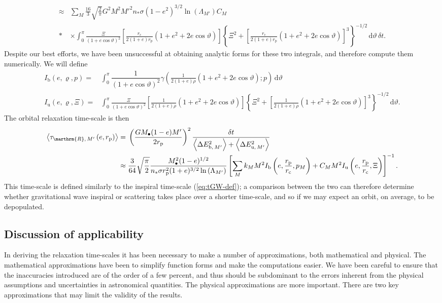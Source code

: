 \documentclass[useAMS,usedcolumn,usegraphicx,usenatbib]{mn2e}
\newcommand{\eqnref}[1]{(\ref{eq:#1})}
\newcommand{\sub}[1]{\ensuremath{_\mathrm{#1}}}
\newcommand{\dd}{\ensuremath{\mathrm{d}}}
\newcommand{\intd}[4]{\ensuremath{\displaystyle \int_{#1}^{#2}{#3}\,\dd{#4}}}
\newcommand{\recip}[1]{\ensuremath{\dfrac{1}{#1}}}
\begin{document}
\begin{onecolumn}
\begin{align}
 \approx {} & \sum_M \frac{16}{3}\sqrt{\frac{2}{\pi}}G^2 M^2{M'}^2n_\ast\sigma\left(1-e^2\right)^{3/2}\ln\left(\Lambda_{M'}\right)C_M \nonumber \\*
 & \times {} \intd{0}{\pi}{\frac{\Xi}{(1 + e \cos\vartheta)^2}\left[\frac{r\sub{c}}{2(1+e)r\sub{p}}\left(1+e^2+2e\cos\vartheta\right)\right]\left\{\Xi^2 + \left[\frac{r\sub{c}}{2(1+e)r\sub{p}}\left(1+e^2+2e\cos\vartheta\right)\right]^3\right\}^{-1/2}}{\vartheta}\,\delta t.
\end{align}
Despite our best efforts, we have been unsuccessful at obtaining analytic forms for these two integrals, and therefore compute them numerically. We will define
\begin{align}
I\sub{b}(e,\varrho,p) = {} & \intd{0}{\pi}{\recip{(1 + e \cos\vartheta)^2}\gamma\left(\frac{1}{2(1+e)\rho}\left(1+e^2+2e\cos\vartheta\right);p\right)}{\vartheta} \\
I\sub{u}(e,\varrho,\Xi) = {} & \intd{0}{\pi}{\frac{\Xi}{(1 + e \cos\vartheta)^2}\left[\frac{1}{2(1+e)\rho}\left(1+e^2+2e\cos\vartheta\right)\right]\left\{\Xi^2 + \left[\frac{1}{2(1+e)\rho}\left(1+e^2+2e\cos\vartheta\right)\right]^3\right\}^{-1/2}}{\vartheta}.
\end{align}
The orbital relaxation time-scale is then
\begin{align}
\left\langle\tau_{\marthrm{R},\,M'}\left(e,r\sub{p}\right)\right\rangle = {} & \left(\frac{GM_\bullet(1 - e)M'}{2r\sub{p}}\right)^2\frac{\delta t}{\left\langle\Delta E^2_{\mathrm{b},\,M'}\right\rangle + \left\langle\Delta E^2_{\mathrm{u},\,M'}\right\rangle} \\
 \approx {} & \frac{3}{64}\sqrt{\frac{\pi}{2}} \frac{M_\bullet^2(1 - e)^{1/2}}{n_\ast \sigma r\sub{p}^2(1 + e)^{3/2}\ln\left(\Lambda_{M'}\right)} \left[\sum_M k_M M^2 I\sub{b}\left(e,\frac{r\sub{p}}{r\sub{c}},p_M\right) + C_M M^2 I\sub{u}\left(e,\frac{r\sub{p}}{r\sub{c}},\Xi\right)\right]^{-1}.
\end{align}
This time-scale is defined similarly to the inspiral time-scale \eqnref{tGW-def}; a comparison between the two can therefore determine whether gravitational wave inspiral or scattering takes place over a shorter time-scale, and so if we may expect an orbit, on average, to be depopulated.

\subsection{Discussion of applicability}

In deriving the relaxation time-scales it has been necessary to make a number of approximations, both mathematical and physical. The mathematical approximations have been to simplify function forms and make the computations easier. We have been careful to ensure that the inaccuracies introduced are of the order of a few percent, and thus should be subdominant to the errors inherent from the physical assumptions and uncertainties in astronomical quantities. The physical approximations are more important. There are two key approximations that may limit the validity of the results.


\end{onecolumn}
\end{document}
